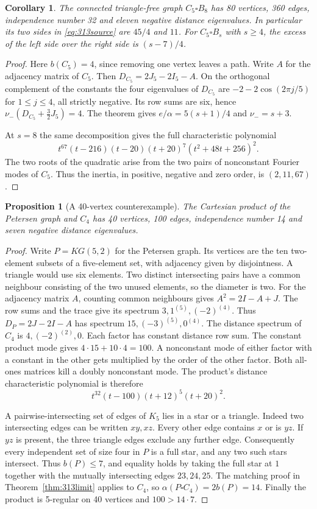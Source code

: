 \documentclass[11pt,a4paper]{article}
\newtheorem{corollary}[theorem]{Corollary}
\newtheorem{proposition}[theorem]{Proposition}
\begin{document}
\begin{corollary}\label{cor:313eighty}
The connected triangle-free graph $C_5\square B_8$ has 80 vertices,
360 edges, independence number 32 and eleven negative distance eigenvalues.
In particular its two sides in \eqref{eq:313source} are $45/4$ and $11$.
For $C_5\square B_s$ with $s\ge4$, the excess of the left side over the
right side is $(s-7)/4$.
\end{corollary}
\begin{proof}
Here $b(C_5)=4$, since removing one vertex leaves a path. Write $A$ for
the adjacency matrix of $C_5$. Then $D_{C_5}=2J_5-2I_5-A$. On the orthogonal
complement of the constants the four eigenvalues of $D_{C_5}$ are
$-2-2\cos(2\pi j/5)$ for $1\le j\le4$, all strictly negative. Its row sums
are six, hence $\nu_-(D_{C_5}+\tfrac32J_5)=4$. The theorem gives
$e/\alpha=5(s+1)/4$ and $\nu_-=s+3$.

At $s=8$ the same decomposition gives the full characteristic polynomial
\[
 t^{67}(t-216)(t-20)(t+20)^7(t^2+48t+256)^2.
\]
The two roots of the quadratic arise from the two pairs of nonconstant
Fourier modes of $C_5$. Thus the inertia, in positive, negative and zero
order, is $(2,11,67)$.
\end{proof}
\begin{proposition}[A 40-vertex counterexample]\label{prop:petersen}
The Cartesian product of the Petersen graph and $C_4$ has 40 vertices,
100 edges, independence number 14 and seven negative distance eigenvalues.
\end{proposition}
\begin{proof}
Write $P=KG(5,2)$ for the Petersen graph. Its vertices are the ten
two-element subsets of a five-element set, with adjacency given by
disjointness. A triangle would use six elements. Two distinct intersecting
pairs have a common neighbour consisting of the two unused elements,
so the diameter is two. For the adjacency matrix $A$, counting common
neighbours gives $A^2=2I-A+J$. The row sums and the trace give its
spectrum $3,1^{(5)},(-2)^{(4)}$. Thus $D_P=2J-2I-A$ has spectrum
$15,(-3)^{(5)},0^{(4)}$. The distance spectrum of $C_4$ is
$4,(-2)^{(2)},0$. Each factor has constant distance row sum. The
constant product mode gives $4\cdot15+10\cdot4=100$.
A nonconstant mode of either factor with a constant in the other
gets multiplied by the order of the other factor. Both all-ones
matrices kill a doubly nonconstant mode. The product's distance
characteristic polynomial is therefore
\[
 t^{32}(t-100)(t+12)^5(t+20)^2.
\]

A pairwise-intersecting set of edges of $K_5$ lies in a star or a
triangle. Indeed two intersecting edges can be written $xy,xz$.
Every other edge contains $x$ or is $yz$. If $yz$ is present, the
three triangle edges exclude any further edge. Consequently every
independent set of size four in $P$ is a full star, and any two such
stars intersect. Thus $b(P)\le7$, and equality holds by taking the full
star at $1$ together with the mutually intersecting edges $23,24,25$.
The matching proof in Theorem~\ref{thm:313limit} applies to $C_4$,
so $\alpha(P\square C_4)=2b(P)=14$. Finally the product is
5-regular on 40 vertices and $100>14\cdot7$.
\end{proof}
\end{document}
